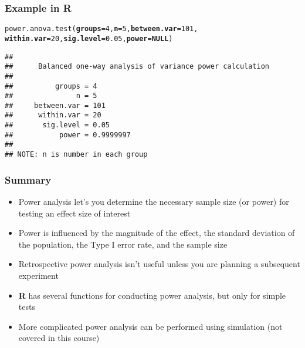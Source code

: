 \documentclass[color=usenames,dvipsnames]{beamer}\usepackage[]{graphicx}\usepackage[]{color}
\makeatletter
\newcommand{\hlnum}[1]{\textcolor[rgb]{0.69,0.494,0}{#1}}%
\newcommand{\hlstd}[1]{\textcolor[rgb]{0,0,0}{#1}}%
\newcommand{\hlkwa}[1]{\textcolor[rgb]{0,0,0}{\textbf{#1}}}%
\newcommand{\hlkwc}[1]{\textcolor[rgb]{0,0,0}{\textbf{#1}}}%
\newcommand{\hlkwd}[1]{\textcolor[rgb]{0.004,0.004,0.506}{#1}}%
\newenvironment{kframe}{%
 \def\at@end@of@kframe{}%
 \ifinner\ifhmode%
  \def\at@end@of@kframe{\end{minipage}}%
  \begin{minipage}{\columnwidth}%
 \fi\fi%
 \def\FrameCommand##1{\hskip\@totalleftmargin \hskip-\fboxsep
 \colorbox{shadecolor}{##1}\hskip-\fboxsep
     \hskip-\linewidth \hskip-\@totalleftmargin \hskip\columnwidth}%
 \MakeFramed {\advance\hsize-\width
   \@totalleftmargin\z@ \linewidth\hsize
   \@setminipage}}%
 {\par\unskip\endMakeFramed%
 \at@end@of@kframe}
\newenvironment{knitrout}{}{} %
\makeatother
\begin{document}
\begin{frame}[fragile]
  \frametitle{Example in {\bf R}}
\begin{knitrout}\footnotesize
{}\color{fgcolor}\begin{kframe}
\begin{alltt}
\hlkwd{power.anova.test}\hlstd{(}\hlkwc{groups}\hlstd{=}\hlnum{4}\hlstd{,} \hlkwc{n}\hlstd{=}\hlnum{5}\hlstd{,} \hlkwc{between.var}\hlstd{=}\hlnum{101}\hlstd{,}
                 \hlkwc{within.var}\hlstd{=}\hlnum{20}\hlstd{,} \hlkwc{sig.level}\hlstd{=}\hlnum{0.05}\hlstd{,} \hlkwc{power}\hlstd{=}\hlkwa{NULL}\hlstd{)}
\end{alltt}
\begin{verbatim}
## 
##      Balanced one-way analysis of variance power calculation 
## 
##          groups = 4
##               n = 5
##     between.var = 101
##      within.var = 20
##       sig.level = 0.05
##           power = 0.9999997
## 
## NOTE: n is number in each group
\end{verbatim}
\end{kframe}
\end{knitrout}
\end{frame}








\begin{frame}
  \frametitle{Summary}
  \begin{itemize}[<+->]
    \item Power analysis let's you determine the necessary sample size
      (or power) for testing an effect size of interest
    \item Power is influenced by the magnitude of the effect, the
      standard deviation of the population, the Type I error rate, and
      the sample size
    \item Retrospective power analysis isn't useful unless you are
      planning a subsequent experiment
    \item {\bf R} has several functions for conducting power analysis,
      but only for simple tests
    \item More complicated power analysis can be performed using
      simulation (not covered in this course)
  \end{itemize}
\end{frame}
\end{document}

